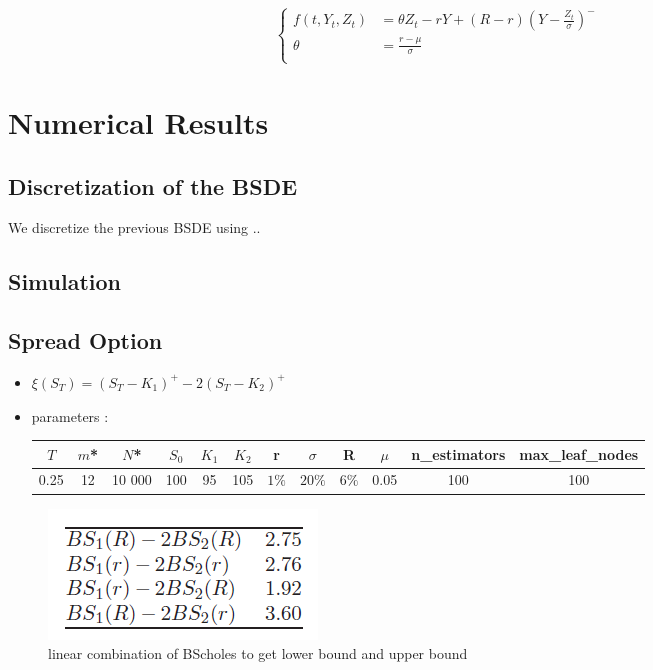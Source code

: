 \documentclass[english,a4paper,12pt,titlepage]{book}
\begin{document}
\[
\left\{
\begin{aligned}
	f(t,Y_t,Z_t) & =\theta Z_t - rY + (R-r)(Y-\frac{Z_t}{\sigma})^-\\
	\theta &= \frac{r-\mu}{\sigma}\\
\end{aligned}
\right.
\]


\section{Numerical Results}

\subsection{Discretization of the BSDE}

We discretize the previous BSDE using ..

\subsection{Simulation}

\subsection{Spread Option}

\begin{itemize}
	\item $\xi(S_T)=(S_T-K_1)^+-2(S_T-K_2)^+$
	\item parameters : 
	
	\begin{tabular}{c|c|c|c|c|c|c|c|c|c|c|c}
		$T$ & $m$* & $N$* & $S_0$  & $K_1$ & $K_2$ & r& $\sigma$ & R & $\mu$ & n\_estimators & max\_leaf\_nodes\\
		\hline
		0.25  & 12 & 10 000 & 100  & 95 & 105 & $1\%$ & $20\% $ & $6\%$ & 0.05 & 100 & 100
	\end{tabular}
\end{itemize}



\begin{figure}[!htb]
	\centering
	\includegraphics[scale=0.65]{spread_option_lower_upper_bound.png}
	\caption{linear combination of BScholes to get lower bound and upper bound }
\end{figure}
\end{document}
